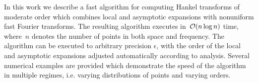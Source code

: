 In this work we describe a fast algorithm for computing Hankel transforms of
moderate order which combines local and asymptotic expansions with nonuniform
fast Fourier transforms. The resulting algorithm executes in~$\mathcal{O} (n \log n)$
time, where~$n$ denotes the number of points in both space and frequency.  The
algorithm can be executed to arbitrary precision $\epsilon$, with the order of
the local and asymptotic expansions adjusted automatically according to
analysis. Several numerical examples are provided which demonstrate the speed of
the algorithm in multiple regimes, i.e. varying distributions of points and
varying orders.
